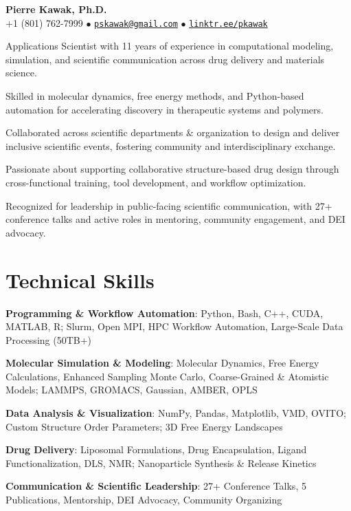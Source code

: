 \begin{center}
  {\LARGE \textbf{Pierre Kawak, Ph.D.} }\\[1ex]
  +1 (801) 762-7999 $\bullet$ \href{mailto:pskawak@gmail.com}{\tt pskawak@gmail.com} $\bullet$ \href{https://linktr.ee/pkawak}{\tt linktr.ee/pkawak}\\
\end{center}
\begin{tabitemize}
  \item Applications Scientist with 11 years of experience in computational modeling, simulation, and scientific communication across drug delivery and materials science.
  \item Skilled in molecular dynamics, free energy methods, and Python-based automation for accelerating discovery in therapeutic systems and polymers.
  \item Collaborated across scientific departments \& organization to design and deliver inclusive scientific events, fostering community and interdisciplinary exchange.
  \item Passionate about supporting collaborative structure-based drug design through cross-functional training, tool development, and workflow optimization.
  \item Recognized for leadership in public-facing scientific communication, with 27+ conference talks and active roles in mentoring, community engagement, and DEI advocacy.
\end{tabitemize}
\vspace{-1.5\baselineskip}
\section*{Technical Skills}
\begin{tabitemize}
  \item \textbf{Programming \& Workflow Automation}: Python, Bash, C++, CUDA, MATLAB, R; Slurm, Open MPI, HPC Workflow Automation, Large-Scale Data Processing (50TB+)
  \item \textbf{Molecular Simulation \& Modeling}: Molecular Dynamics, Free Energy Calculations, Enhanced Sampling Monte Carlo, Coarse-Grained \& Atomistic Models; LAMMPS, GROMACS, Gaussian, AMBER, OPLS
  \item \textbf{Data Analysis \& Visualization}: NumPy, Pandas, Matplotlib, VMD, OVITO; Custom Structure Order Parameters; 3D Free Energy Landscapes
  \item \textbf{Drug Delivery}: Liposomal Formulations, Drug Encapsulation, Ligand Functionalization, DLS, NMR; Nanoparticle Synthesis \& Release Kinetics
  \item \textbf{Communication \& Scientific Leadership}: 27+ Conference Talks, 5 Publications, Mentorship, DEI Advocacy, Community Organizing
\end{tabitemize}
